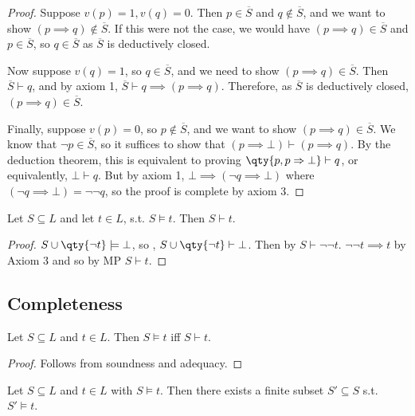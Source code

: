 \begin{proof}
    Suppose $v(p) = 1, v(q) = 0$.
    Then $p \in \overline S$ and $q \not\in \overline S$, and we want to show $(p \implies q) \not\in \overline S$.
    If this were not the case, we would have $(p \implies q) \in \overline S$ and $p \in \overline S$, so $q \in \overline S$ as $\overline S$ is deductively closed.

    Now suppose $v(q) = 1$, so $q \in \overline S$, and we need to show $(p \implies q) \in \overline S$.
    Then $\overline S \vdash q$, and by axiom 1, $\overline S \vdash q \implies (p \implies q)$.
    Therefore, as $\overline S$ is deductively closed, $(p \implies q) \in \overline S$.

    Finally, suppose $v(p) = 0$, so $p \not\in \overline S$, and we want to show $(p \implies q) \in \overline S$.
    We know that $\neg p \in \overline S$, so it suffices to show that $(p \implies \bot) \vdash (p \implies q)$.
    By the deduction theorem, this is equivalent to proving $\qty{p, p \implies \bot} \vdash q$, or equivalently, $\bot \vdash q$.
    But by axiom 1, $\bot \implies (\neg q \implies \bot)$ where $(\neg q \implies \bot) = \neg\neg q$, so the proof is complete by axiom 3.
\end{proof}

\begin{corollary}[Adequacy]
    Let $S \subseteq L$ and let $t \in L$, s.t. $S \models t$.
    Then $S \vdash t$.
\end{corollary}

\begin{proof}
    $S \cup \qty{\neg t} \models \bot$, so , $S \cup \qty{\neg t} \vdash \bot$.
    Then by  $S \vdash \neg \neg t$.
    $\neg \neg t \implies t$ by Axiom 3 and so by MP $S \vdash t$.
\end{proof}

\subsection{Completeness}
\begin{theorem}
    Let $S \subseteq L$ and $t \in L$.
    Then $S \models t$ iff $S \vdash t$.
\end{theorem}

\begin{proof}
    Follows from soundness and adequacy.
\end{proof}

\begin{theorem}
    Let $S \subseteq L$ and $t \in L$ with $S \models t$.
    Then there exists a finite subset $S' \subseteq S$ s.t. $S' \models t$.
\end{theorem}

